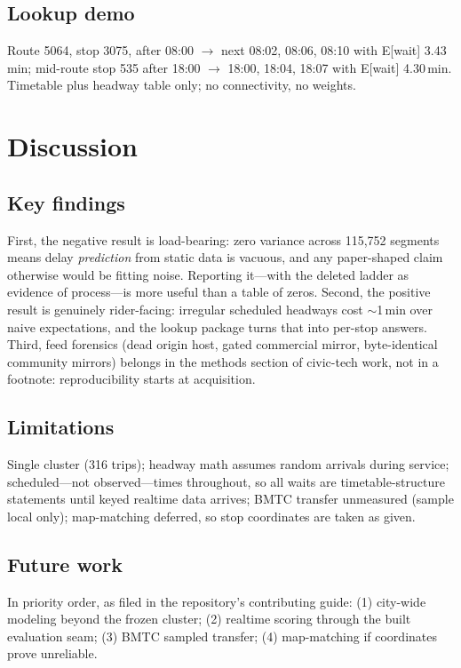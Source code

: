 \documentclass[11pt,a4paper]{article}
\begin{document}
\subsection{Lookup demo}

Route 5064, stop 3075, after 08:00 $\to$ next 08:02, 08:06, 08:10 with E[wait] 3.43\,min; mid-route stop 535 after 18:00 $\to$ 18:00, 18:04, 18:07 with E[wait] 4.30\,min. Timetable plus headway table only; no connectivity, no weights.

\section{Discussion}
\label{sec:discussion}

\subsection{Key findings}

First, the negative result is load-bearing: zero variance across 115,752 segments means delay \textit{prediction} from static data is vacuous, and any paper-shaped claim otherwise would be fitting noise. Reporting it---with the deleted ladder as evidence of process---is more useful than a table of zeros. Second, the positive result is genuinely rider-facing: irregular scheduled headways cost $\sim$1\,min over naive expectations, and the lookup package turns that into per-stop answers. Third, feed forensics (dead origin host, gated commercial mirror, byte-identical community mirrors) belongs in the methods section of civic-tech work, not in a footnote: reproducibility starts at acquisition.

\subsection{Limitations}

Single cluster (316 trips); headway math assumes random arrivals during service; scheduled---not observed---times throughout, so all waits are timetable-structure statements until keyed realtime data arrives; BMTC transfer unmeasured (sample local only); map-matching deferred, so stop coordinates are taken as given.

\subsection{Future work}

In priority order, as filed in the repository's contributing guide: (1) city-wide modeling beyond the frozen cluster; (2) realtime scoring through the built evaluation seam; (3) BMTC sampled transfer; (4) map-matching if coordinates prove unreliable.
\end{document}
